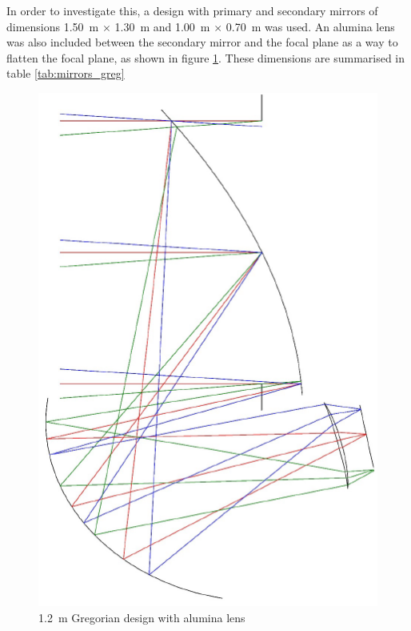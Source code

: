 \documentclass[11pt,a4paper]{article}
\begin{document}
In order to investigate this, a design with primary and secondary mirrors of dimensions 1.50~m $\times$ 1.30~m and 1.00~m $\times$ 0.70~m was used. An alumina lens was also included between the secondary mirror and the focal plane as a way to flatten the focal plane, as shown in figure \ref{fig:gregschem_lens}. These dimensions are summarised in table \ref{tab:mirrors_greg}
\begin{figure}[htbp]
	\centering
	\includegraphics[scale=0.5]{core_greg_lens.png}
	\caption{1.2~m Gregorian design with alumina lens}
	\label{fig:gregschem_lens}
\end{figure}
\end{document}
